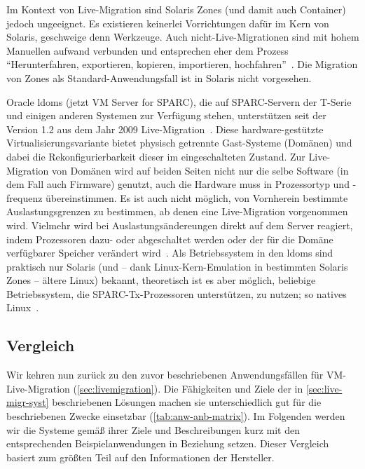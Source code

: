 Im Kontext von Live-Migration sind Solaris Zones (und damit auch
Container) jedoch ungeeignet. Es existieren keinerlei Vorrichtungen
dafür im Kern von Solaris, geschweige denn Werkzeuge. Auch
nicht-Live-Migrationen sind mit hohem Manuellen aufwand verbunden und
entsprechen eher dem Prozess "`Herunterfahren, exportieren, kopieren,
importieren, hochfahren"'~\cite{Kimchi:Solaris-Zones-m}. Die Migration
von Zones als Standard-Anwendungsfall ist in Solaris nicht vorgesehen.

Oracle \acfp{ldom} (jetzt VM Server for SPARC), die auf SPARC-Servern
der T-Serie und einigen anderen Systemen zur Verfügung stehen,
unterstützen seit der Version 1.2 aus dem Jahr 2009
Live-Migration~\cite{Laurent:Answering-a-cus}. Diese
hardware-gestützte Virtualisierungsvariante bietet physisch getrennte
Gast-Systeme (Domänen) und dabei die Rekonfigurierbarkeit dieser im
eingeschalteten Zustand. Zur Live-Migration von Domänen wird auf
beiden Seiten nicht nur die selbe Software (in dem Fall auch Firmware)
genutzt, auch die Hardware muss in Prozessortyp und -frequenz
übereinstimmen. Es ist auch nicht möglich, von Vornherein bestimmte
Auslastungsgrenzen zu bestimmen, ab denen eine Live-Migration
vorgenommen wird. Vielmehr wird bei Auslastungsändereungen direkt auf
dem Server reagiert, indem \zB Prozessoren dazu- oder abgeschaltet
werden oder der für die Domäne verfügbarer Speicher verändert
wird~\cite{2010:Oracle-VM-Serve}. Als Betriebssystem in den \acp{ldom}
sind praktisch nur Solaris (und -- dank Linux-Kern-Emulation in
bestimmten Solaris Zones -- ältere Linux) bekannt, theoretisch ist es
aber möglich, beliebige Betriebssystem, die SPARC-Tx-Prozessoren
unterstützen, zu nutzen; so \zB natives
Linux~\cite{Chartre:Linux-with-LDom}.



\subsection{Vergleich}
Wir kehren nun zurück zu den zuvor beschriebenen Anwendungsfällen für
\ac{VM}-Live-Migration (\autoref{sec:livemigration}). Die Fähigkeiten
und Ziele der in \autoref{sec:live-migr-syst} beschriebenen Lösungen
machen sie unterschiedlich gut für die beschriebenen Zwecke einsetzbar
(\autoref{tab:anw-anb-matrix}). Im Folgenden werden wir die Systeme
gemäß ihrer Ziele und Beschreibungen kurz mit den entsprechenden
Beispielanwendungen in Beziehung setzen. Dieser Vergleich basiert zum
größten Teil auf den Informationen der Hersteller.

